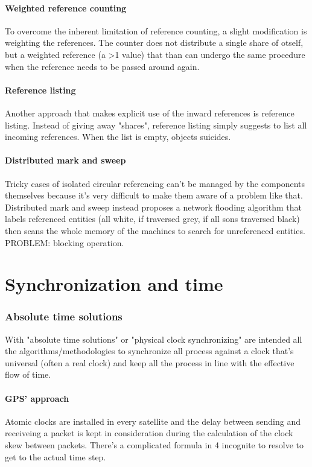 \documentclass[10pt,a4paper]{article}
\begin{document}
			\subsection{Weighted reference counting}
				To overcome the inherent limitation of reference counting, a slight modification is weighting the references. The counter does not distribute a single share of otself, but a weighted reference (a >1 value) that than can undergo the same procedure when the reference needs to be passed around again.
			\subsection{Reference listing}
				Another approach that makes explicit use of the inward references is reference listing. Instead of giving away "shares", reference listing simply suggests to list all incoming references. When the list is empty, objects suicides.
			\subsection{Distributed mark and sweep}
				Tricky cases of isolated circular referencing can't be managed by the components themselves because it's very difficult to make them aware of a problem like that. Distributed mark and sweep instead proposes a network flooding algorithm that labels referenced entities (all white, if traversed grey, if all sons traversed black) then scans the whole memory of the machines to search for unreferenced entities. PROBLEM: blocking operation.
	
	\part{Synchronization and time}
		\section{Absolute time solutions}
			With "absolute time solutions" or "physical clock synchronizing" are intended all the algorithms/methodologies to synchronize all process against a clock that's universal (often a real clock) and keep all the process in line with the effective flow of time.
			
			\subsection{GPS' approach}
				Atomic clocks are installed in every satellite and the delay between sending and receiveing a packet is kept in consideration during the calculation of the clock skew between packets. There's a complicated formula in 4 incognite to resolve to get to the actual time step.
\end{document}

